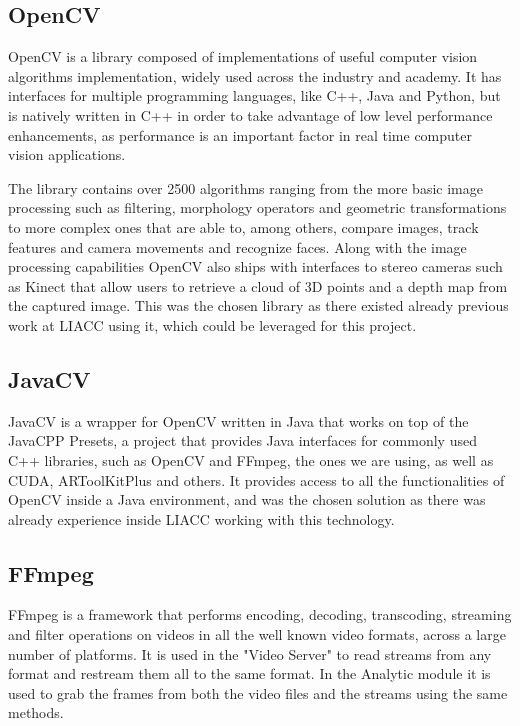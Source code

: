 \subsection{OpenCV}
OpenCV is a library composed of implementations of useful computer vision algorithms implementation, widely used across the industry and academy. It has interfaces for multiple programming languages, like C++, Java and Python, but is natively written in C++ in order to take advantage of low level performance enhancements, as performance is an important factor in real time computer vision applications.

The library contains over 2500 algorithms ranging from the more basic image processing such as filtering, morphology operators and geometric transformations to more complex ones that are able to, among others, compare images, track features and camera movements and recognize faces. Along with the image processing capabilities OpenCV also ships with interfaces to stereo cameras such as Kinect that allow users to retrieve a cloud of 3D points and a depth map from the captured image. This was the chosen library as there existed already previous work at LIACC using it, which could be leveraged for this project.

\subsection{JavaCV}
JavaCV is a wrapper for OpenCV written in Java that works on top of the JavaCPP Presets, a project that provides Java interfaces for commonly used C++ libraries, such as OpenCV and FFmpeg, the ones we are using, as well as CUDA, ARToolKitPlus and others. It provides access to all the functionalities of OpenCV inside a Java environment, and was the chosen solution as there was already experience inside LIACC working with this technology.

\subsection{FFmpeg}
FFmpeg is a framework that performs encoding, decoding, transcoding, streaming and filter operations on videos in all the well known video formats, across a large number of platforms. It is used in the "Video Server" to read streams from any format and restream them all to the same format. In the Analytic module it is used to grab the frames from both the video files and the streams using the same methods.

